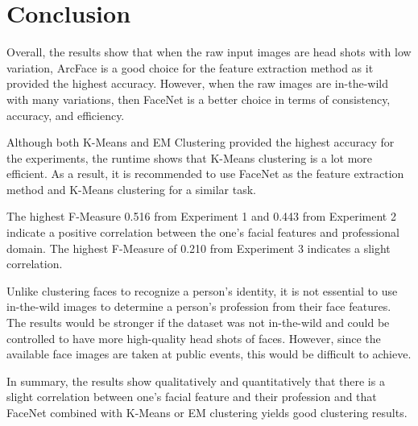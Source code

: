 \documentclass[12pt,english]{article}
\begin{document}
\section{Conclusion}
\quad
Overall, the results show that when the raw input images are head shots with low variation, ArcFace is a good choice for the feature extraction method as it provided the highest accuracy. However, when the raw images are in-the-wild with many variations, then FaceNet is a better choice in terms of consistency, accuracy, and efficiency.  

Although both K-Means and EM Clustering provided the highest accuracy for the experiments, the runtime shows that K-Means clustering is a lot more efficient. As a result, it is recommended to use FaceNet as the feature extraction method and K-Means clustering for a similar task.

The highest F-Measure 0.516 from Experiment 1 and 0.443 from Experiment 2 indicate a positive correlation between the one's facial features and professional domain. The highest F-Measure of 0.210 from Experiment 3 indicates a slight correlation.

Unlike clustering faces to recognize a person’s identity, it is not essential to use in-the-wild images to determine a person’s profession from their face features. The results would be stronger if the dataset was not in-the-wild and could be controlled to have more high-quality head shots of faces. However, since the available face images are taken at public events, this would be difficult to achieve.  

In summary, the results show qualitatively and quantitatively that there is a slight correlation between one’s facial feature and their profession and that FaceNet combined with K-Means or EM clustering yields good clustering results.
\end{document}
